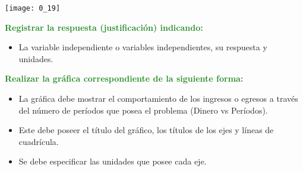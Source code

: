 \begin{enumerate}
\begin{enumerate}
		            \begin{center}
			            \texttt{[image: 0\_19]}
		            \end{center}
	      \end{enumerate}
	      
	      \textcolor{ForestGreen}{\item \textbf{Registrar la respuesta (justificación) indicando:}}
	      \begin{itemize}
		      \color{ForestGreen}
		      \item La variable independiente o variables independientes, su respuesta y unidades.
	      \end{itemize}
	      
	      \textcolor{ForestGreen}{\item \textbf{Realizar la gráfica correspondiente de la siguiente forma:}}
	      \begin{itemize}
		      \color{ForestGreen}
		      \item La gráfica debe mostrar el comportamiento de los ingresos o egresos a través del número de períodos que posea el problema (Dinero vs Períodos).
		      \item Este debe poseer el título del gráfico, los títulos de los ejes y líneas de cuadrícula.
		      \item Se debe especificar las unidades que posee cada eje.
	      \end{itemize}
	      
	      
\end{enumerate}
